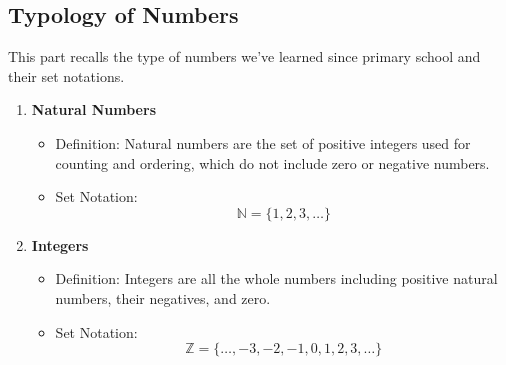 \subsection{Typology of Numbers}
This part recalls the type of numbers we've learned since primary school and their set notations.
\label{sec:number}
\begin{enumerate}
  \item \textbf{Natural Numbers}
  \begin{itemize}
    \item Definition: Natural numbers are the set of positive integers used for counting and ordering, which do not include zero or negative numbers.
    \item Set Notation:
    \[
    \mathbb{N} = \{1, 2, 3, \ldots\}
    \]
  \end{itemize}

  \item \textbf{Integers}
  \begin{itemize}
    \item Definition: Integers are all the whole numbers including positive natural numbers, their negatives, and zero.
    \item Set Notation:
    \[
    \mathbb{Z} = \{\ldots, -3, -2, -1, 0, 1, 2, 3, \ldots\}
    \]
  \end{itemize}


\end{enumerate}
